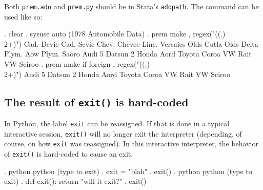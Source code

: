 \documentclass{article}
\begin{document}
\medskip
\medskip

Both \lstinline{prem.ado} and \lstinline{prem.py} should be in Stata's \lstinline{adopath}. The command can be used like so:

\begin{stlog}
. clear
{\smallskip}
. sysuse auto
(1978 Automobile Data)
{\smallskip}
. prem make , regex("((.)\\2+)")
Cad. Devi{}e
Cad. Sevi{}e
Chev. Cheve{}e
Linc. Versai{}es
Olds Cutla{}
Olds Delta {}
Plym. A{}ow
Plym. Sa{}oro
Audi 5{}
Datsun 2{}
Honda A{}ord
Toyota Coro{}a
VW Ra{}it
VW Sciro{}o
{\smallskip}
. prem make if foreign , regex("((.)\\2+)")
Audi 5{}
Datsun 2{}
Honda A{}ord
Toyota Coro{}a
VW Ra{}it
VW Sciro{}o
\end{stlog}

\smallskip



\subsection{The result of \lstinline$exit()$ is hard-coded}

In Python, the label \lstinline$exit$ can be reassigned. If that is done in a typical interactive session, \lstinline$exit()$ will no longer exit the interpreter (depending, of course, on how \lstinline$exit$ was reassigned). In this interactive interpreter, the behavior of \lstinline$exit()$ is hard-coded to cause an exit.

\begin{stlog}
. python
 python (type {} to exit) 
{\bftt{>>>}}. exit = "blah"
{\smallskip}
{\bftt{>>>}}. exit()
{\smallskip}
. python
 python (type {} to exit) 
{\bftt{>>>}}. def exit(): return "will it exit?"
{\smallskip}
{\bftt{>>>}}. exit()
\end{stlog}

		
\end{document}
